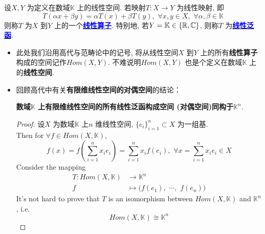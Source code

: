 	\begin{defn}\label{def 4.1.1}
		设$X , Y$ 为定义在数域$\mathbb{K}$ 上的线性空间. 若映射$T : X \longrightarrow Y$ 为线性映射, 即
		\[ T(\alpha x + \beta y) = \alpha T(x) + \beta T(y) , \,\, \forall x , y \in X , \,\, \forall \alpha , \beta \in \mathbb{K} \]
		则称$T$ 为$X$ 到$Y$ 上的一个\underline{\textcolor{blue}{\textbf{线性算子}}}. 特别地, 若$Y = \mathbb{K} \in \{ \mathbb{R} , \mathbb{C} \}$, 则称$T$ 为\underline{\textcolor{blue}{\textbf{线性泛函}}}. 
		
		\vspace{4em}
		
		\begin{rmk}
			\begin{itemize}
				\item 此处我们沿用高代与范畴论中的记号, 将从线性空间$X$ 到$Y$ 上的所有\textbf{线性算子}构成的空间记作\textbf{$Hom(X , Y)$}. 不难说明$Hom(X , Y)$ 也是个定义在数域$\mathbb{K}$ 上的\textbf{线性空间}. 
				
				\vspace*{4em}
				
				\item 回顾高代中有关\textbf{有限维线性空间的对偶空间}的结论：
				\begin{center}
					\textbf{数域$\mathbb{K}$ 上有限维线性空间的所有线性泛函构成空间 (对偶空间)同构于$\mathbb{K}^n$}. 
				\end{center} 
				
				\vspace*{2em}
				
				\begin{proof}
					设$X$ 为数域$\mathbb{K}$ 上$n$ 维线性空间, $\{ e_i \}_{i = 1}^n \subset X$ 为一组基. \\
					Then for $\forall f \in Hom(X , \mathbb{K})$, 
					\[ f(x) = f \left( \sum_{i = 1}^n x_i e_i \right) = \sum_{i = 1}^n x_i f(e_i) , \,\, \forall x = \sum_{i = 1}^n x_i e_i \in X \]
					Consider the mapping 
					\begin{align}
						T : Hom(X , \mathbb{K}) &\longrightarrow \mathbb{K}^n \\
						f &\longmapsto \Big( f(e_1) , \,\, \cdots , \,\, f(e_n) \Big)
					\end{align}
					It's not hard to prove that $T$ is an isomorphism between $Hom(X , \mathbb{K})$ and $\mathbb{K}^n$, i.e. 
					\[ Hom(X , \mathbb{K}) \cong \mathbb{K}^n \]
				\end{proof}
			\end{itemize}
		\end{rmk}
	\end{defn}
	
